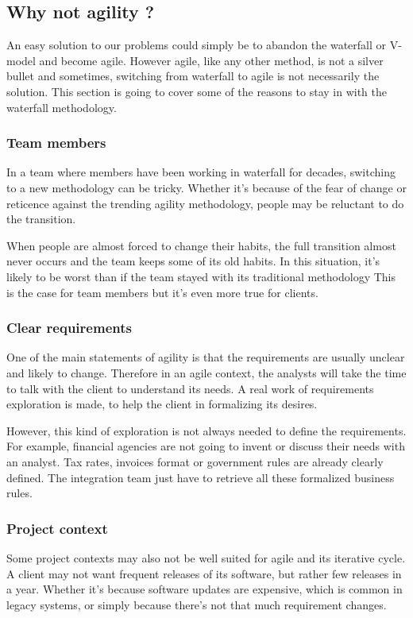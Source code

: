 \subsection{Why not agility ?}\label{subsec:whby-not-agility}
An easy solution to our problems could simply be to abandon the waterfall or
V-model and become agile.
However agile, like any other method, is not a silver bullet and sometimes,
switching from waterfall to agile is not necessarily the solution.
This section is going to cover some of the reasons to stay in with the
waterfall methodology.

\subsubsection{Team members}
In a team where members have been working in waterfall for decades, switching
to a new methodology can be tricky.
Whether it's because of the fear of change or reticence against the
trending agility methodology, people may be reluctant to do the transition.

When people are almost forced to change their habits, the full transition
almost never occurs and the team keeps some of its old habits.
In this situation, it's likely to be worst than if the team stayed with its
traditional methodology
This is the case for team members but it's even more true for clients.

\subsubsection{Clear requirements}
One of the main statements of agility is that the requirements are usually
unclear and likely to change.
Therefore in an agile context, the analysts will take the time to talk with
the client to understand its needs.
A real work of requirements exploration is made, to help the client
in formalizing its desires.

However, this kind of exploration is not always needed to define the
requirements.
For example, financial agencies are not going to invent or discuss their
needs with an analyst.
Tax rates, invoices format or government rules are already clearly defined.
The integration team just have to retrieve all these formalized business rules.

\subsubsection{Project context}
Some project contexts may also not be well suited for agile and its iterative
cycle.
A client may not want frequent releases of its software, but rather few
releases in a year.
Whether it's because software updates are expensive, which is common in
legacy systems, or simply because there's not that much requirement changes.

